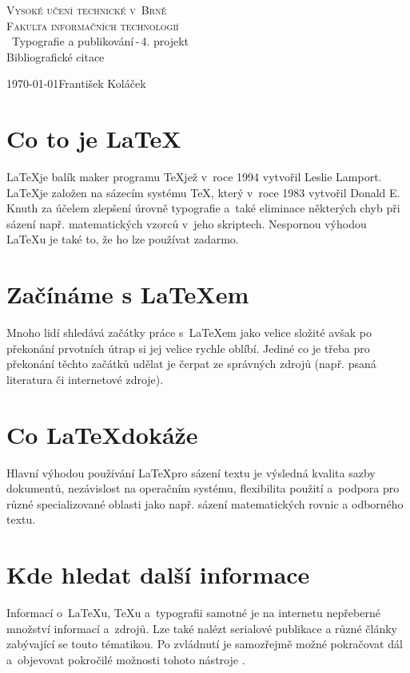 \documentclass[a4paper, 11pt]{article}
\begin{document}
\begin{titlepage}
\begin{center}
\Huge
\textsc{Vysoké učení technické v~Brně}        \\
\huge
\textsc{Fakulta informačních technologií}     \\
\
\LARGE{Typografie a publikování\,-\,4. projekt} \\
\Huge{Bibliografické citace} 		      \\
\end{center}
\Large{\today \hfill František Koláček}
\end{titlepage}

\newpage

\section{Co to je \LaTeX}
\LaTeX je balík maker programu \TeX jež v~roce 1994 vytvořil Leslie Lamport. \LaTeX je založen na sázecím systému \TeX, který v~roce 1983 vytvořil Donald E. Knuth za účelem zlepšení úrovně typografie a~také eliminace některých chyb při sázení např. matematických vzorců v~jeho skriptech. Nespornou výhodou \LaTeX u je také to, že ho lze používat zadarmo.

\section{Začínáme s \LaTeX em}
Mnoho lidí shledává začátky práce s~\LaTeX em jako velice složité avšak po překonání prvotních útrap si jej velice rychle oblíbí. Jediné co je třeba pro překonání těchto začátků udělat je čerpat ze správných zdrojů (např. psaná literatura\cite{zaciname:zacatecnici}\cite{zaciname:zacatecnici-en} či internetové zdroje\cite{zaciname:CSTUG}).
\section{Co \LaTeX dokáže}
Hlavní výhodou používání \LaTeX pro sázení textu je výsledná kvalita sazby dokumentů, nezávislost na operačním systému, flexibilita použití a~podpora pro různé specializované oblasti jako např. sázení matematických rovnic\cite{Zagorova:mutlimedialni-diskretni-matematika} a odborného textu\cite{Bojko:problematika-sazby-odborneho-textu}.

\section{Kde hledat další informace}
Informací o~\LaTeX u, \TeX u a~typografii samotné je na internetu nepřeberné množství informací a~zdrojů. Lze také nalézt serialové publikace\cite{zdroje:typografia} a různé články\cite{zdroje:rootcz}\cite{zdroje:abclinuxucz} zabývající se touto tématikou. Po zvládnutí je samozřejmě možné pokračovat dál a~objevovat pokročilé možnosti tohoto nástroje \cite{zdroje:mistru}\cite{zdroje:martinek}.

\newpage


\def \refname{Použitá literatura}

\end{document}
